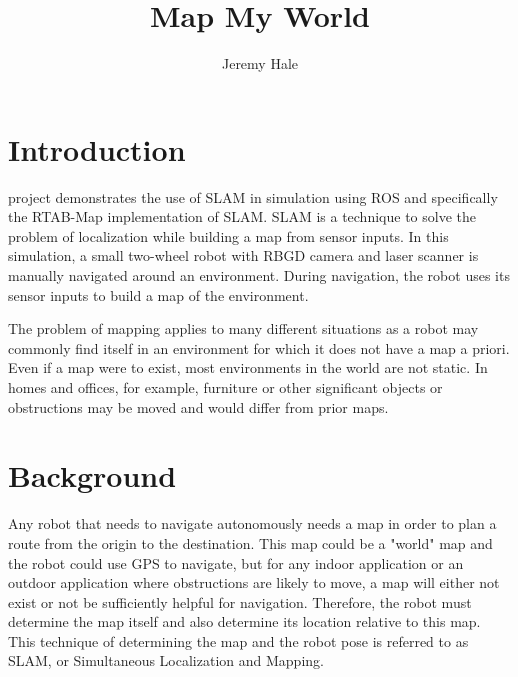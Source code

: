 \documentclass[10pt,journal,compsoc]{IEEEtran}
\begin{document}
\title{Map My World}

\author{Jeremy Hale}

%
{}


\maketitle
\IEEEdisplaynontitleabstractindextext
\IEEEpeerreviewmaketitle
\section{Introduction}
\label{sec:introduction}

 project demonstrates the use of SLAM in simulation using ROS and specifically the RTAB-Map implementation of SLAM. SLAM is a technique to solve the problem of localization while building a map from sensor inputs. In this simulation, a small two-wheel robot with RBGD camera and laser scanner is manually navigated around an environment. During navigation, the robot uses its sensor inputs to build a map of the environment.

The problem of mapping applies to many different situations as a robot may commonly find itself in an environment for which it does not have a map a priori. Even if a map were to exist, most environments in the world are not static. In homes and offices, for example, furniture or other significant objects or obstructions may be moved and would differ from prior maps.

\section{Background}
Any robot that needs to navigate autonomously needs a map in order to plan a route from the origin to the destination. This map could be a "world" map and the robot could use GPS to navigate, but for any indoor application or an outdoor application where obstructions are likely to move, a map will either not exist or not be sufficiently helpful for navigation. Therefore, the robot must determine the map itself and also determine its location relative to this map. This technique of determining the map and the robot pose is referred to as SLAM, or Simultaneous Localization and Mapping.
\end{document}
